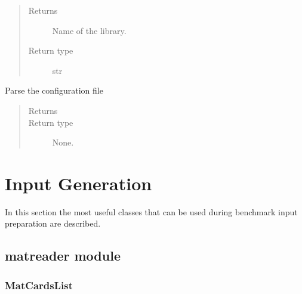 \documentclass[letterpaper,10pt,english]{sphinxmanual}
\begin{document}
\begin{fulllineitems}
\begin{fulllineitems}
\begin{quote}
\begin{description}
\item[{Returns}] \leavevmode
Name of the library.

\item[{Return type}] \leavevmode
str

\end{description}\end{quote}

\end{fulllineitems}


\begin{fulllineitems}
\label{\detokenize{api/initobjects:configuration.Configuration.read_settings}}
Parse the configuration file
\begin{quote}\begin{description}
\item[{Returns}] \leavevmode


\item[{Return type}] \leavevmode
None.

\end{description}\end{quote}

\end{fulllineitems}


\end{fulllineitems}



\chapter{Input Generation}
\label{\detokenize{api/inputgeneration:input-generation}}\label{\detokenize{api/inputgeneration::doc}}
In this section the most useful classes that can be used during benchmark
input preparation are described.


\section{matreader module}
\label{\detokenize{api/inputgeneration:matreader-module}}

\subsection{MatCardsList}
\label{\detokenize{api/inputgeneration:matcardslist}}\label{\detokenize{api/inputgeneration:matcardob}}
\end{document}
